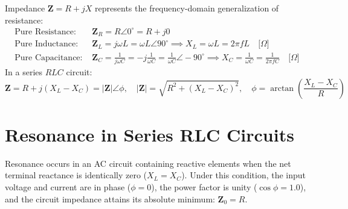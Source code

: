 \begin{definition}
Impedance $\mathbf{Z} = R + jX$ represents the frequency-domain generalization of resistance:
\begin{align}
\text{Pure Resistance: } & \mathbf{Z}_R = R \angle 0^\circ = R + j0 \\
\text{Pure Inductance: } & \mathbf{Z}_L = j\omega L = \omega L \angle 90^\circ \implies X_L = \omega L = 2\pi f L \quad \text{[$\Omega$]} \\
\text{Pure Capacitance: } & \mathbf{Z}_C = \frac{1}{j\omega C} = -j\frac{1}{\omega C} = \frac{1}{\omega C} \angle -90^\circ \implies X_C = \frac{1}{\omega C} = \frac{1}{2\pi f C} \quad \text{[$\Omega$]}
\end{align}
In a series $RLC$ circuit:
\begin{equation}
\mathbf{Z} = R + j(X_L - X_C) = |\mathbf{Z}|\angle \phi, \quad |\mathbf{Z}| = \sqrt{R^2 + (X_L - X_C)^2}, \quad \phi = \arctan\left(\frac{X_L - X_C}{R}\right)
\end{equation}
\end{definition}

\section{Resonance in Series RLC Circuits}
\begin{definition}
Resonance occurs in an AC circuit containing reactive elements when the net terminal reactance is identically zero ($X_L = X_C$). Under this condition, the input voltage and current are in phase ($\phi = 0$), the power factor is unity ($\cos\phi = 1.0$), and the circuit impedance attains its absolute minimum: $\mathbf{Z}_0 = R$.
\end{definition}

